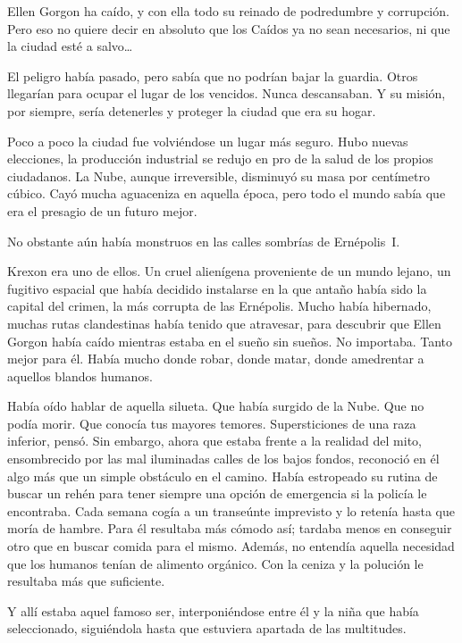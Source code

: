 \begin{prev}
    Ellen Gorgon ha caído, y con ella todo su reinado de podredumbre y corrupción. Pero eso no quiere decir en absoluto que los Caídos ya no sean necesarios, ni que la ciudad esté a salvo\dots
\end{prev}

\noindent
El peligro había pasado, pero sabía que no podrían bajar la guardia. Otros llegarían para ocupar el lugar de los vencidos. Nunca descansaban. Y su misión, por siempre, sería detenerles y proteger la ciudad que era su hogar.

\bigskip\noindent
Poco a poco la ciudad fue volviéndose un lugar más seguro. Hubo nuevas elecciones, la producción industrial se redujo en pro de la salud de los propios ciudadanos. La Nube, aunque irreversible, disminuyó su masa por centímetro cúbico. Cayó mucha aguaceniza en aquella época, pero todo el mundo sabía que era el presagio de un futuro mejor.

No obstante aún había monstruos en las calles sombrías de Ernépolis~I.

Krexon era uno de ellos. Un cruel alienígena proveniente de un mundo lejano, un fugitivo espacial que había decidido instalarse en la que antaño había sido la capital del crimen, la más corrupta de las Ernépolis. Mucho había hibernado, muchas rutas clandestinas había tenido que atravesar, para descubrir que Ellen Gorgon había caído mientras estaba en el sueño sin sueños. No importaba. Tanto mejor para él. Había mucho donde robar, donde matar, donde amedrentar a aquellos blandos humanos.

Había oído hablar de aquella silueta. Que había surgido de la Nube. Que no podía morir. Que conocía tus mayores temores. Supersticiones de una raza inferior, pensó. Sin embargo, ahora que estaba frente a la realidad del mito, ensombrecido por las mal iluminadas calles de los bajos fondos, reconoció en él algo más que un simple obstáculo en el camino. Había estropeado su rutina de buscar un rehén para tener siempre una opción de emergencia si la policía le encontraba. Cada semana cogía a un transeúnte imprevisto y lo retenía hasta que moría de hambre. Para él resultaba más cómodo así; tardaba menos en conseguir otro que en buscar comida para el mismo. Además, no entendía aquella necesidad que los humanos tenían de alimento orgánico. Con la ceniza y la polución le resultaba más que suficiente.

Y allí estaba aquel famoso ser, interponiéndose entre él y la niña que había seleccionado, siguiéndola hasta que estuviera apartada de las multitudes.

